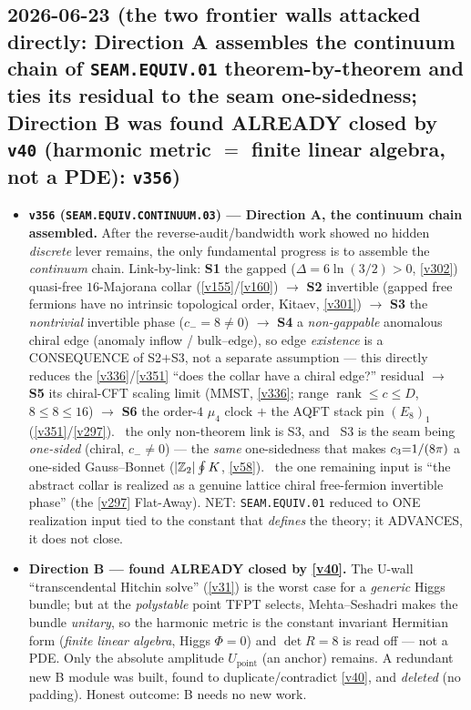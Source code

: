 \subsection*{2026-06-23 (the two frontier walls attacked directly: Direction A assembles the continuum chain of \texttt{SEAM.EQUIV.01} theorem-by-theorem and ties its residual to the seam one-sidedness; Direction B was found ALREADY closed by \texttt{v40} (harmonic metric $=$ finite linear algebra, not a PDE): \texttt{v356})}
\begin{itemize}
\item \textbf{\texttt{v356} (\texttt{SEAM.EQUIV.CONTINUUM.03}) --- Direction A, the continuum chain assembled.} After the
reverse-audit/bandwidth work showed no hidden \emph{discrete} lever remains, the only fundamental progress is to
assemble the \emph{continuum} chain. Link-by-link: \textbf{S1} the gapped ($\Delta{=}6\ln(3/2){>}0$, \vref{v302})
quasi-free $16$-Majorana collar (\vref{v155}/\vref{v160}) $\to$ \textbf{S2} invertible (gapped free fermions have no
intrinsic topological order, Kitaev, \vref{v301}) $\to$ \textbf{S3} the \emph{nontrivial} invertible phase
($c_-{=}8{\neq}0$) $\to$ \textbf{S4} a \emph{non-gappable} anomalous chiral edge (anomaly inflow / bulk--edge), so
edge \emph{existence} is a CONSEQUENCE of S2$+$S3, not a separate assumption --- this directly reduces the
\vref{v336}/\vref{v351} ``does the collar have a chiral edge?'' residual $\to$ \textbf{S5} its chiral-CFT scaling limit
(MMST, \vref{v336}; range $\operatorname{rank}\le c\le D$, $8\le8\le16$) $\to$ \textbf{S6} the order-$4$ $\mu_4$ clock
$+$ the AQFT stack pin $(E_8)_1$ (\vref{v351}/\vref{v297}). \mE\ the only non-theorem link is S3, and \mC\ S3 is the
seam being \emph{one-sided} (chiral, $c_-{\neq}0$) --- the \emph{same} one-sidedness that makes $c_3{=}1/(8\pi)$ a
one-sided Gauss--Bonnet ($|\mathbb{Z}_2|\oint K$, \vref{v58}). \mO\ the one remaining input is ``the abstract collar is
realized as a genuine lattice chiral free-fermion invertible phase'' (the \vref{v297} Flat-Away). NET: \texttt{SEAM.EQUIV.01}
reduced to ONE realization input tied to the constant that \emph{defines} the theory; it ADVANCES, it does not close.
\item \textbf{Direction B --- found ALREADY closed by \vref{v40}.} The U-wall ``transcendental Hitchin solve'' (\vref{v31})
is the worst case for a \emph{generic} Higgs bundle; but at the \emph{polystable} point TFPT selects, Mehta--Seshadri
makes the bundle \emph{unitary}, so the harmonic metric is the constant invariant Hermitian form (\emph{finite linear
algebra}, Higgs $\Phi{=}0$) and $\det R{=}8$ is read off --- not a PDE. Only the absolute amplitude $U_{\mathrm{point}}$
(an anchor) remains. A redundant new B module was built, found to duplicate/contradict \vref{v40}, and \emph{deleted}
(no padding). Honest outcome: B needs no new work.
\end{itemize}

